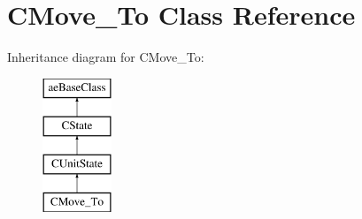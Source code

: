 \hypertarget{class_c_move___to}{}\section{C\+Move\+\_\+\+To Class Reference}
\label{class_c_move___to}
Inheritance diagram for C\+Move\+\_\+\+To\+:\begin{figure}[H]
\begin{center}
\leavevmode
\includegraphics[height=4.000000cm]{class_c_move___to}
\end{center}
\end{figure}

